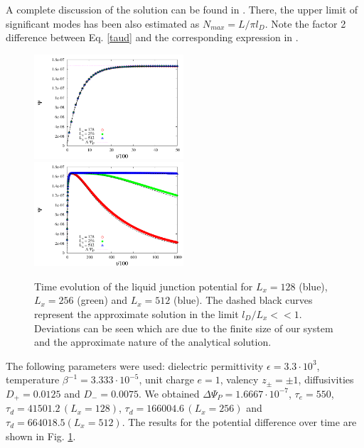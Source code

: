 \documentclass[aps,pre,preprint,groupedaddress]{revtex4-1}
\newcommand{\e}[1]{\cdot10^{#1}}
\begin{document}
A complete discussion of the solution can be found in \cite{Mafe}. 
There, the upper limit of significant modes has been also estimated as $N_{max} = L/\pi l_D$.
Note the factor 2 difference between Eq. \ref{taud} and the corresponding expression in \cite{Mafe}.
\begin{figure}[h!t]
\includegraphics[width=0.495\textwidth]{test_lj_zoom1.pdf}
\includegraphics[width=0.495\textwidth]{test_lj_zoom3.pdf}
\caption{Time evolution of the liquid junction potential for $L_x=128$ (blue), $L_x=256$ (green) and $L_x=512$ (blue). The dashed black curves represent the approximate solution in the limit $l_D/L_x<<1$. Deviations can be seen which are due
to the finite size of our system and the approximate nature of the analytical solution.} 
\label{fig3} 
\end{figure}

The following parameters were used:
dielectric permittivity $\epsilon=3.3\e{3}$, temperature $\beta^{-1}=3.333\e{-5}$, unit charge $e=1$, valency $z_\pm=\pm1$, diffusivities $D_+=0.0125$ and $D_-=0.0075$.
We obtained
$\Delta\Psi_P=1.6667\e{-7}$, $\tau_e=550$, $\tau_d=41501.2\, (L_x=128)$, $\tau_d=166004.6\, (L_x=256)$ and $\tau_d=664018.5 (L_x=512)$.
The results for the potential difference over time are shown in Fig. \ref{fig3}.
\end{document}
